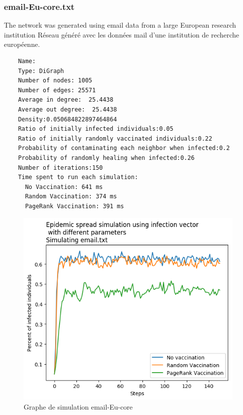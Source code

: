 \documentclass{report}
\begin{document}
\subsubsection{email-Eu-core.txt}
The network was generated using email data from a large European research institution
Réseau généré avec les données mail d'une institution de recherche européenne.
\begin{tcolorbox}
  \begin{verbatim}
    Name:
    Type: DiGraph
    Number of nodes: 1005
    Number of edges: 25571
    Average in degree:  25.4438
    Average out degree:  25.4438
    Density:0.050684822897464864
    Ratio of initially infected individuals:0.05
    Ratio of initially randomly vaccinated individuals:0.22
    Probability of contaminating each neighbor when infected:0.2
    Probability of randomly healing when infected:0.26
    Number of iterations:150
    Time spent to run each simulation:
      No Vaccination: 641 ms
      Random Vaccination: 374 ms
      PageRank Vaccination: 391 ms
  \end{verbatim}
\end{tcolorbox}
\begin{figure}[ht!]
  \centering
  \includegraphics[scale=0.7]{../plots/email.png}
  \caption{Graphe de simulation email-Eu-core}
\end{figure}
\newpage
\end{document}
